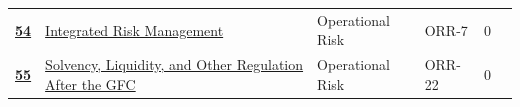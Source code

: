 \begin{longtable}{@{}r@{\hskip 7pt}L{6.35cm}@{\hskip 5pt}l@{\hskip 10pt}l@{\hskip 3pt}r@{\hskip 7pt}r@{}}
\hyperref[roi:54]{{\sffamily\bfseries\color{FRMGold}54}} & \hyperref[roi:54]{{\color{black}Integrated Risk Management}} & {\color{FRMGrey}Operational Risk} & {\color{FRMGrey}ORR-7} & {\color{FRMGrey}0} & \hyperref[roi:54]{{\sffamily\bfseries\color{FRMNavy}\pageref{roi:54}}} \\
\hyperref[roi:55]{{\sffamily\bfseries\color{FRMGold}55}} & \hyperref[roi:55]{{\color{black}Solvency, Liquidity, and Other Regulation After the GFC}} & {\color{FRMGrey}Operational Risk} & {\color{FRMGrey}ORR-22} & {\color{FRMGrey}0} & \hyperref[roi:55]{{\sffamily\bfseries\color{FRMNavy}\pageref{roi:55}}} \\
\end{longtable}
